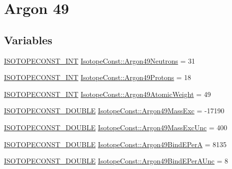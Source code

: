 \hypertarget{group___isotope_const-_argon-_ar49}{}\section{Argon 49}
\label{group___isotope_const-_argon-_ar49}
\subsection*{Variables}
\begin{DoxyCompactItemize}
\item 
\mbox{\hyperlink{group___isotope_const-_macros_ga5f18360b3e99483a35c32d789e62621c}{I\+S\+O\+T\+O\+P\+E\+C\+O\+N\+S\+T\+\_\+\+I\+NT}} \mbox{\hyperlink{group___isotope_const-_argon-_ar49_gaa9a718018ab6ab21c129967263ac2c7c}{Isotope\+Const\+::\+Argon49\+Neutrons}} = 31
\item 
\mbox{\hyperlink{group___isotope_const-_macros_ga5f18360b3e99483a35c32d789e62621c}{I\+S\+O\+T\+O\+P\+E\+C\+O\+N\+S\+T\+\_\+\+I\+NT}} \mbox{\hyperlink{group___isotope_const-_argon-_ar49_ga65c09dcc4bafd9051c6e0ef007c2bee4}{Isotope\+Const\+::\+Argon49\+Protons}} = 18
\item 
\mbox{\hyperlink{group___isotope_const-_macros_ga5f18360b3e99483a35c32d789e62621c}{I\+S\+O\+T\+O\+P\+E\+C\+O\+N\+S\+T\+\_\+\+I\+NT}} \mbox{\hyperlink{group___isotope_const-_argon-_ar49_ga98eb56511403f5c82d30560060f421e0}{Isotope\+Const\+::\+Argon49\+Atomic\+Weight}} = 49
\item 
\mbox{\hyperlink{group___isotope_const-_macros_ga8f45a7272ce02c0b4c65c44636ed719a}{I\+S\+O\+T\+O\+P\+E\+C\+O\+N\+S\+T\+\_\+\+D\+O\+U\+B\+LE}} \mbox{\hyperlink{group___isotope_const-_argon-_ar49_gaf962c543aa1b42fae7eb5757cce2b8ad}{Isotope\+Const\+::\+Argon49\+Mass\+Exc}} = -\/17190
\item 
\mbox{\hyperlink{group___isotope_const-_macros_ga8f45a7272ce02c0b4c65c44636ed719a}{I\+S\+O\+T\+O\+P\+E\+C\+O\+N\+S\+T\+\_\+\+D\+O\+U\+B\+LE}} \mbox{\hyperlink{group___isotope_const-_argon-_ar49_ga5a00c268c2a404542e3bf5b51ace4929}{Isotope\+Const\+::\+Argon49\+Mass\+Exc\+Unc}} = 400
\item 
\mbox{\hyperlink{group___isotope_const-_macros_ga8f45a7272ce02c0b4c65c44636ed719a}{I\+S\+O\+T\+O\+P\+E\+C\+O\+N\+S\+T\+\_\+\+D\+O\+U\+B\+LE}} \mbox{\hyperlink{group___isotope_const-_argon-_ar49_ga23806384048f37c4371b7e6c21759185}{Isotope\+Const\+::\+Argon49\+Bind\+E\+PerA}} = 8135
\item 
\mbox{\hyperlink{group___isotope_const-_macros_ga8f45a7272ce02c0b4c65c44636ed719a}{I\+S\+O\+T\+O\+P\+E\+C\+O\+N\+S\+T\+\_\+\+D\+O\+U\+B\+LE}} \mbox{\hyperlink{group___isotope_const-_argon-_ar49_gac17d92df92327dd4311075556b31ef75}{Isotope\+Const\+::\+Argon49\+Bind\+E\+Per\+A\+Unc}} = 8

\end{DoxyCompactItemize}
